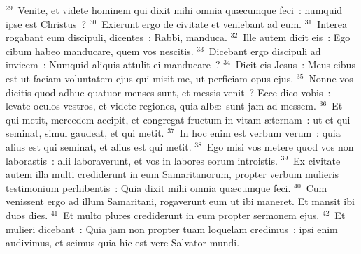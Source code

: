 ${}^{29}$~Venite, et videte hominem qui dixit mihi omnia qu\ae cumque feci~: numquid ipse est Christus~?
${}^{30}$~Exierunt ergo de civitate et veniebant ad eum.
${}^{31}$~Interea rogabant eum discipuli, dicentes~: Rabbi, manduca.
${}^{32}$~Ille autem dicit eis~: Ego cibum habeo manducare, quem vos nescitis.
${}^{33}$~Dicebant ergo discipuli ad invicem~: Numquid aliquis attulit ei manducare~?
${}^{34}$~Dicit eis Jesus~: Meus cibus est ut faciam voluntatem ejus qui misit me, ut perficiam opus ejus.
${}^{35}$~Nonne vos dicitis quod adhuc quatuor menses sunt, et messis venit~? Ecce dico vobis~: levate oculos vestros, et videte regiones, quia alb\ae\ sunt jam ad messem.
${}^{36}$~Et qui metit, mercedem accipit, et congregat fructum in vitam \ae ternam~: ut et qui seminat, simul gaudeat, et qui metit.
${}^{37}$~In hoc enim est verbum verum~: quia alius est qui seminat, et alius est qui metit.
${}^{38}$~Ego misi vos metere quod vos non laborastis~: alii laboraverunt, et vos in labores eorum introistis.
${}^{39}$~Ex civitate autem illa multi crediderunt in eum Samaritanorum, propter verbum mulieris testimonium perhibentis~: Quia dixit mihi omnia qu\ae cumque feci.
${}^{40}$~Cum venissent ergo ad illum Samaritani, rogaverunt eum ut ibi maneret. Et mansit ibi duos dies.
${}^{41}$~Et multo plures crediderunt in eum propter sermonem ejus.
${}^{42}$~Et mulieri dicebant~: Quia jam non propter tuam loquelam credimus~: ipsi enim audivimus, et scimus quia hic est vere Salvator mundi.


